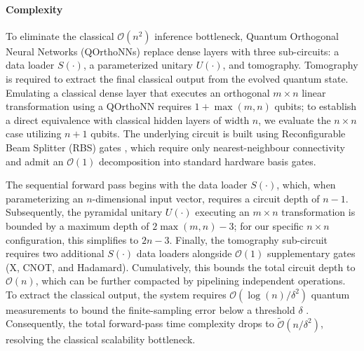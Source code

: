 \documentclass{iopjournal}
\begin{document}
\paragraph{Complexity} To eliminate the classical $\mathcal{O}(n^{2})$ inference bottleneck, Quantum Orthogonal Neural Networks (QOrthoNNs) \cite{kerenidis2022qorthonn, landman2022medicalqorthonn} replace dense layers with three sub-circuits: a data loader $S(\cdot)$, a parameterized unitary $U(\cdot)$, and tomography.  Tomography is required to extract the final classical output from the evolved quantum state. Emulating a classical dense layer that executes an orthogonal $m \times n$ linear transformation using a QOrthoNN requires $1+\max(m,n)$ qubits; to establish a direct equivalence with classical hidden layers of width $n$, we evaluate the $n \times n$ case utilizing $n+1$ qubits. The underlying circuit is built using Reconfigurable Beam Splitter (RBS) gates \cite{kerenidis2022qorthonn, landman2022medicalqorthonn, xiao2025qdon}, which require only nearest-neighbour connectivity and admit an $\mathcal{O}(1)$ decomposition into standard hardware basis gates. 

The sequential forward pass begins with the data loader $S(\cdot)$, which, when parameterizing an $n$-dimensional input vector, requires a circuit depth of $n-1$. Subsequently, the pyramidal unitary $U(\cdot)$ executing an $m \times n$ transformation is bounded by a maximum depth of $2\max(m,n)-3$; for our specific $n \times n$ configuration, this simplifies to $2n-3$. Finally, the tomography sub-circuit requires two additional $S(\cdot)$ data loaders alongside $\mathcal{O}(1)$ supplementary gates (X, CNOT, and Hadamard). Cumulatively, this bounds the total circuit depth to $\mathcal{O}(n)$, which can be further compacted by pipelining independent operations. To extract the classical output, the system requires $\mathcal{O}(\log(n)/\delta^{2})$ quantum measurements to bound the finite-sampling error below a threshold $\delta$ \cite{kerenidis2022qorthonn, landman2022medicalqorthonn}. Consequently, the total forward-pass time complexity drops to $\tilde{\mathcal{O}}(n/\delta^{2})$, resolving the classical scalability bottleneck.
\end{document}

